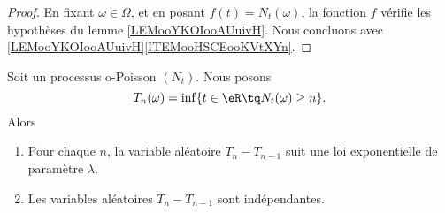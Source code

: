 \begin{proof}
	En fixant \( \omega\in \Omega\), et en posant \( f(t)=N_t(\omega)\), la fonction \( f\) vérifie les hypothèses du lemme \ref{LEMooYKOIooAUuivH}. Nous concluons avec \ref{LEMooYKOIooAUuivH}\ref{ITEMooHSCEooKVtXYn}.
\end{proof}

\begin{proposition}	\label{PROPooIQPSooHtbFBt}
	Soit un processus o-Poisson \( (N_t)\). Nous posons
	\begin{equation}
		T_n(\omega)=\inf\{ t\in \eR\tq N_t(\omega)\geq n \}.
	\end{equation}
	Alors
	\begin{enumerate}
		\item
		      Pour chaque \( n\), la variable aléatoire \( T_n-T_{n-1}\) suit une loi exponentielle de paramètre \( \lambda\).
		\item
		      Les variables aléatoires \( T_n-T_{n-1}\) sont indépendantes.
	\end{enumerate}
\end{proposition}

